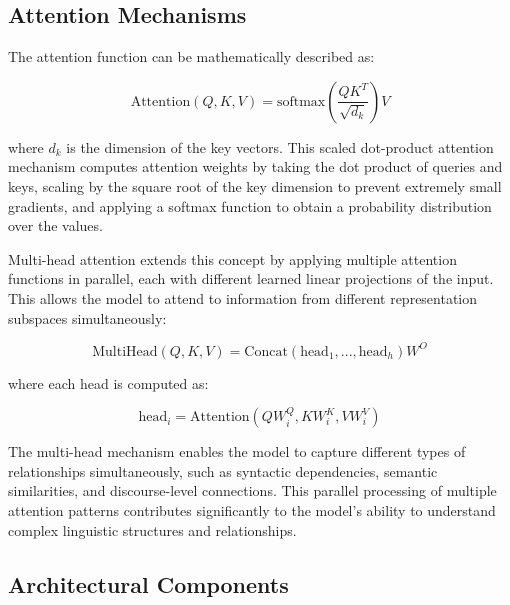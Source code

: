 \subsection{Attention Mechanisms}

The attention function can be mathematically described as:

\begin{equation}
\text{Attention}(Q, K, V) = \text{softmax}\left(\frac{QK^T}{\sqrt{d_k}}\right)V
\end{equation}

where $d_k$ is the dimension of the key vectors. This scaled dot-product attention mechanism computes attention weights by taking the dot product of queries and keys, scaling by the square root of the key dimension to prevent extremely small gradients, and applying a softmax function to obtain a probability distribution over the values.


Multi-head attention extends this concept by applying multiple attention functions in parallel, each with different learned linear projections of the input. This allows the model to attend to information from different representation subspaces simultaneously:

\begin{equation}
\text{MultiHead}(Q, K, V) = \text{Concat}(\text{head}_1, ..., \text{head}_h)W^O
\end{equation}

where each head is computed as:

\begin{equation}
\text{head}_i = \text{Attention}(QW_i^Q, KW_i^K, VW_i^V)
\end{equation}

The multi-head mechanism enables the model to capture different types of relationships simultaneously, such as syntactic dependencies, semantic similarities, and discourse-level connections. This parallel processing of multiple attention patterns contributes significantly to the model's ability to understand complex linguistic structures and relationships.

\subsection{Architectural Components}

